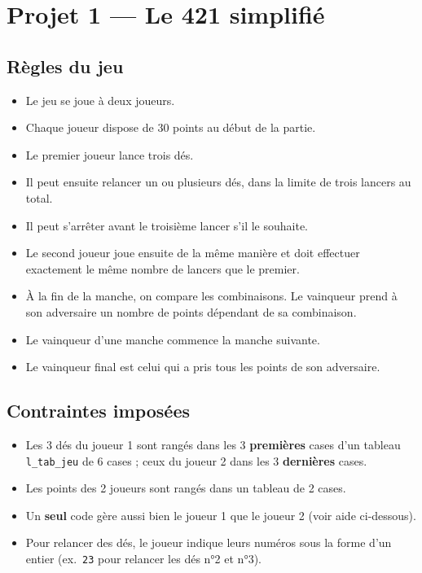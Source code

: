 \section{Projet 1 — Le 421 simplifié}

\subsection*{Règles du jeu}
\begin{itemize}
  \item Le jeu se joue à deux joueurs.
  \item Chaque joueur dispose de 30 points au début de la partie.
  \item Le premier joueur lance trois dés.
  \item Il peut ensuite relancer un ou plusieurs dés, dans la limite de trois lancers au total.
  \item Il peut s’arrêter avant le troisième lancer s’il le souhaite.
  \item Le second joueur joue ensuite de la même manière et doit effectuer exactement le même nombre de lancers que le premier.
  \item À la fin de la manche, on compare les combinaisons. Le vainqueur prend à son adversaire un nombre de points dépendant de sa combinaison.
  \item Le vainqueur d’une manche commence la manche suivante.
  \item Le vainqueur final est celui qui a pris tous les points de son adversaire.
\end{itemize}

\subsection*{Contraintes imposées}
\begin{itemize}
  \item Les 3 dés du joueur 1 sont rangés dans les 3 \textbf{premières} cases d'un tableau \texttt{l\_tab\_jeu} de 6 cases ; ceux du joueur 2 dans les 3 \textbf{dernières} cases.
  \item Les points des 2 joueurs sont rangés dans un tableau de 2 cases.
  \item Un \textbf{seul} code gère aussi bien le joueur 1 que le joueur 2 (voir aide ci-dessous).
  \item Pour relancer des dés, le joueur indique leurs numéros sous la forme d'un entier (ex.\ \texttt{23} pour relancer les dés n°2 et n°3).
\end{itemize}

